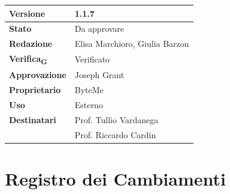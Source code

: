 \documentclass[11pt,a4paper]{article}
\newcommand{\gls}[1]{#1\textsubscript{G}}
\begin{document}
\begin{titlepage}
    \begin{table}[H]
        \centering
        \begin{tabular}{|l|p{5cm}|}
            \hline
            \textbf{Versione} & 1.1.7 \\
            \hline
            \textbf{Stato} & Da approvare \\
            \hline
            \textbf{Redazione} & Elisa Marchioro, Giulia Barzon \\
            \hline
            \textbf{\gls{Verifica}} & Verificato \\
            \hline
            \textbf{Approvazione} & Joseph Grant \\
            \hline
            \textbf{Proprietario} & ByteMe \\
            \hline
            \textbf{Uso} & Esterno \\
            \hline
            \textbf{Destinatari} & Prof. Tullio Vardanega \\ & Prof. Riccardo Cardin \\
            \hline
        \end{tabular}
    \end{table}
    
    \vfill
\end{titlepage}

\thispagestyle{empty}
\section*{Registro dei Cambiamenti}
\end{document}
